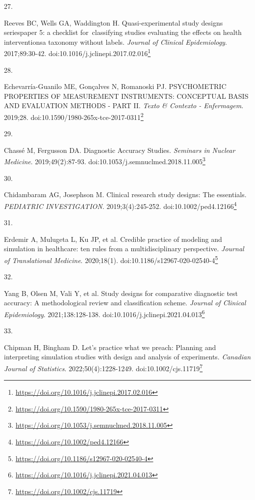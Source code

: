 \documentclass[
  a4paper,
]{book}
\newlength{\cslhangindent}
\newlength{\csllabelwidth}
\newlength{\cslentryspacingunit} %
\newenvironment{CSLReferences}[2] %
 {%
  \setlength{\parindent}{0pt}
  \ifodd #1
  \let\oldpar\par
  \def\par{\hangindent=\cslhangindent\oldpar}
  \fi
  \setlength{\parskip}{#2\cslentryspacingunit}
 }%
 {}
\newcommand{\CSLLeftMargin}[1]{\parbox[t]{\csllabelwidth}{#1}}
\newcommand{\CSLRightInline}[1]{\parbox[t]{\linewidth - \csllabelwidth}{#1}\break}
\renewcommand{\href}[2]{#2\footnote{\url{#1}}}
\begin{document}
\begin{CSLReferences}{0}{0}
\leavevmode{}%
\CSLLeftMargin{27. }%
\CSLRightInline{Reeves BC, Wells GA, Waddington H. Quasi-experimental study designs series{\textemdash}paper 5: a checklist for~classifying studies evaluating the effects on health interventions{\textemdash}a taxonomy without labels. \emph{Journal of Clinical Epidemiology}. 2017;89:30-42. doi:\href{https://doi.org/10.1016/j.jclinepi.2017.02.016}{10.1016/j.jclinepi.2017.02.016}}

\leavevmode{}%
\CSLLeftMargin{28. }%
\CSLRightInline{Echevarría-Guanilo ME, Gonçalves N, Romanoski PJ. PSYCHOMETRIC PROPERTIES OF MEASUREMENT INSTRUMENTS: CONCEPTUAL BASIS AND EVALUATION METHODS - PART II. \emph{Texto \& Contexto - Enfermagem}. 2019;28. doi:\href{https://doi.org/10.1590/1980-265x-tce-2017-0311}{10.1590/1980-265x-tce-2017-0311}}

\leavevmode{}%
\CSLLeftMargin{29. }%
\CSLRightInline{Chassé M, Fergusson DA. Diagnostic Accuracy Studies. \emph{Seminars in Nuclear Medicine}. 2019;49(2):87-93. doi:\href{https://doi.org/10.1053/j.semnuclmed.2018.11.005}{10.1053/j.semnuclmed.2018.11.005}}

\leavevmode{}%
\CSLLeftMargin{30. }%
\CSLRightInline{Chidambaram AG, Josephson M. Clinical research study designs: The essentials. \emph{PEDIATRIC INVESTIGATION}. 2019;3(4):245-252. doi:\href{https://doi.org/10.1002/ped4.12166}{10.1002/ped4.12166}}

\leavevmode{}%
\CSLLeftMargin{31. }%
\CSLRightInline{Erdemir A, Mulugeta L, Ku JP, et al. Credible practice of modeling and simulation in healthcare: ten rules from a multidisciplinary perspective. \emph{Journal of Translational Medicine}. 2020;18(1). doi:\href{https://doi.org/10.1186/s12967-020-02540-4}{10.1186/s12967-020-02540-4}}

\leavevmode{}%
\CSLLeftMargin{32. }%
\CSLRightInline{Yang B, Olsen M, Vali Y, et al. Study designs for comparative diagnostic test accuracy: A methodological review and classification scheme. \emph{Journal of Clinical Epidemiology}. 2021;138:128-138. doi:\href{https://doi.org/10.1016/j.jclinepi.2021.04.013}{10.1016/j.jclinepi.2021.04.013}}

\leavevmode{}%
\CSLLeftMargin{33. }%
\CSLRightInline{Chipman H, Bingham D. Let's practice what we preach: Planning and interpreting simulation studies with design and analysis of experiments. \emph{Canadian Journal of Statistics}. 2022;50(4):1228-1249. doi:\href{https://doi.org/10.1002/cjs.11719}{10.1002/cjs.11719}}


\end{CSLReferences}
\end{document}

